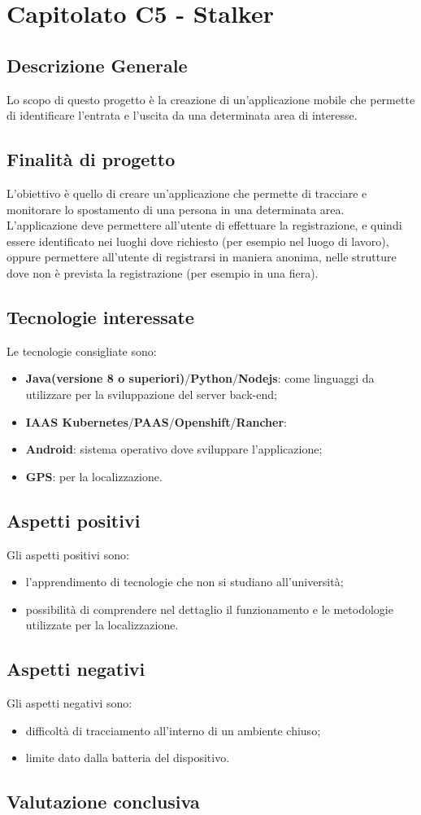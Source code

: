 \section{Capitolato C5 - Stalker}
\subsection{Descrizione Generale}
Lo scopo di questo progetto è la creazione di un'applicazione mobile che permette di identificare l'entrata e l'uscita da una determinata area di interesse.
\subsection{Finalità di progetto}%
L'obiettivo è quello di creare un'applicazione che permette di tracciare e monitorare lo spostamento di una persona in una determinata area. L'applicazione deve permettere all'utente di effettuare la registrazione, e quindi essere identificato nei luoghi dove richiesto (per esempio nel luogo di lavoro), oppure permettere all'utente di registrarsi in maniera anonima, nelle strutture dove non è prevista la registrazione (per esempio in una fiera).
\subsection{Tecnologie interessate}
Le tecnologie consigliate sono:
\begin{itemize} %
	\item \textbf{Java\glo(versione 8 o superiori)}/\textbf{Python\glo}/\textbf{Nodejs\glo}: come linguaggi da utilizzare per la sviluppazione del server back-end;
	\item \textbf{IAAS Kubernetes\glo}/\textbf{PAAS\glo}/\textbf{Openshift\glo}/\textbf{Rancher\glo}:
	\item \textbf{Android\glo}: sistema operativo dove sviluppare l'applicazione;
	\item \textbf{GPS\glo}: per la localizzazione.
\end{itemize}
\subsection{Aspetti positivi}
Gli aspetti positivi sono:
\begin{itemize}
	\item l'apprendimento di tecnologie che non si studiano all'università;
	\item possibilità di comprendere nel dettaglio il funzionamento e le metodologie utilizzate per la localizzazione.
	
\end{itemize}
\subsection{Aspetti negativi}
Gli aspetti negativi sono:
\begin{itemize}
	\item difficoltà di tracciamento all'interno di un ambiente chiuso;
	\item limite dato dalla batteria del dispositivo.
\end{itemize}
\subsection{Valutazione conclusiva}
